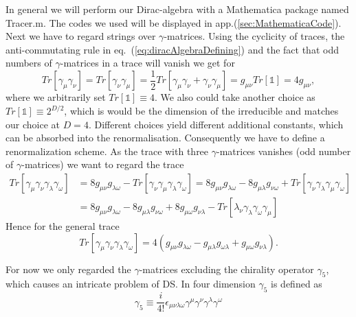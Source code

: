 In general we will perform our Dirac-algebra with a Mathematica package named Tracer.m. The codes we used will be displayed in app.(\ref{sec:MathematicaCode}). \\
Next we have to regard strings over $\gamma$-matrices. Using the cyclicity of traces, the anti-commutating rule in eq.~(\ref{eq:diracAlgebraDefining}) and the fact that odd numbers of $\gamma$-matrices in a trace will vanish we get for 
\begin{equation}
	Tr[\gamma_\mu\gamma_\nu] = Tr[\gamma_\nu\gamma_\mu] = \frac{1}{2}Tr[\gamma_\mu \gamma_\nu + \gamma_\nu \gamma_\mu] = g_{\mu\nu} Tr[\mathbb{1}] = 4g_{\mu\nu},
\end{equation}
where we arbitrarily set $Tr[\mathbb{1}] \equiv 4$. We also could take another choice as $Tr[\mathbb{1}] \equiv 2^{D/2}$, which is would be the dimension of the irreducible and matches our choice at $D=4$. Different choices yield different additional constants, which can be absorbed into the renormalisation. Consequently we have to define a renormalization scheme. As the trace with three $\gamma$-matrices vanishes (odd number of $\gamma$-matrices) we want to regard the trace
\begin{equation}
	\begin{split}
		Tr[\gamma_\mu\gamma_\nu\gamma_\lambda\gamma_\omega] &= 8g_{\mu\nu}g_{\lambda\omega} - Tr[\gamma_\nu\gamma_\mu\gamma_\lambda\gamma_\omega] = 8g_{\mu\nu}g_{\lambda\omega} - 8g_{\mu\lambda}g_{\nu\omega} + Tr[\gamma_\nu\gamma_\lambda\gamma_\mu\gamma_\omega] \\
		&= 8g_{\mu\nu}g_{\lambda\omega} - 8g_{\mu\lambda}g_{\nu\omega} + 8g_{\mu\omega}g_{\nu\lambda} - Tr[\lambda_\nu \gamma_\lambda \gamma_\omega \gamma_\mu] 
	\end{split}
\end{equation}
Hence for the general trace 
\begin{equation}
	Tr[\gamma_\mu\gamma_\nu\gamma_\lambda\gamma_\omega] = 4(g_{\mu\nu}g_{\lambda\omega} - g_{\mu\lambda}g_{\omega\lambda} + g_{\mu\omega} g_{\nu\lambda}).
\end{equation}
\par
For now we only regarded the $\gamma$-matrices excluding the chirality operator $\gamma_5$, which causes an intricate problem of DS. In four dimension $\gamma_5$ is defined as
\begin{equation}
	\gamma_5 \equiv \frac{i}{4!} \epsilon_{\mu\nu\lambda\omega} \gamma^\mu \gamma^\nu \gamma^\lambda \gamma^\omega
\end{equation}  
